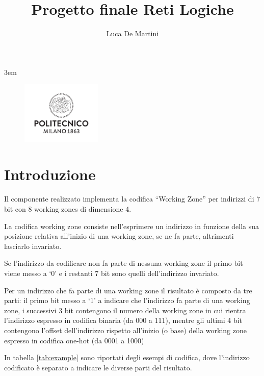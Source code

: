 \documentclass[a4paper]{article}
\title{Progetto finale Reti Logiche}
\author{Luca De Martini}
\date{}
\begin{document}
\setlength\parindent{0pt}
\emergencystretch 3em

\begin{figure}[t]
  \includegraphics[height=3cm]{logoPoli.pdf}
\end{figure}

\maketitle

\section{Introduzione}

Il componente realizzato implementa la codifica ``Working Zone'' per indirizzi di 7 bit con 8 working zones di dimensione 4.

La codifica working zone consiste nell'esprimere un indirizzo in funzione della sua posizione relativa all'inizio di una working zone, se ne fa parte, altrimenti lasciarlo invariato.

Se l'indirizzo da codificare non fa parte di nessuna working zone il primo bit viene messo a `0' e i restanti 7 bit sono quelli dell'indirizzo invariato.

Per un indirizzo che fa parte di una working zone il risultato è composto da tre parti: il primo bit messo a `1' a indicare che l'indirizzo fa parte di una working zone, i successivi 3 bit contengono il numero della working zone in cui rientra l'indirizzo espresso in codifica binaria (da 000 a 111), mentre gli ultimi 4 bit contengono l'offset dell'indirizzo rispetto all'inizio (o base) della working zone espresso in codifica one-hot (da 0001 a 1000)

In tabella \ref{tab:example} sono riportati degli esempi di codifica, dove l'indirizzo codificato è separato a indicare le diverse parti del risultato.
\end{document}
